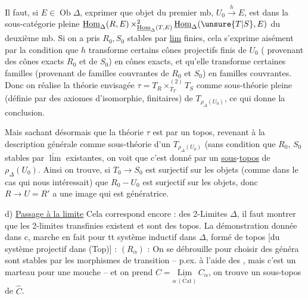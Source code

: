 Il faut, si $E\in\operatorname{Ob}\Delta$, exprimer que  objet du  premier mb, $U_0\xrightarrow{h}E$, est dans  la sous-catégorie pleine $\underline{\mathrm{Hom}}_\Delta(R,E)\mathop{\times}^{2}_{\underline{\mathrm{Hom}}_\Delta(T,E)}\underline{\mathrm{Hom}}_\Delta(\unsure{T|S},E)$ du deuxième mb. Si on a pris $R_0,S_0$ stables par \uline{lim} finies, cela s'exprime aisément par la  condition que $h$ transforme certains cônes projectifs finis de $U_0$ ( provenant des cônes exacts  $R_0$ et de $S_0$) en cônes exacts,
et  qu'elle transforme certaines familles (provenant de familles couvrantes de $R_0$ et $S_0$) en familles couvrantes. Donc on réalise la théorie envisagée $\tau=T_R\mathop{\times}^{(2)}_{T_T}T_S$ comme sous-théorie pleine (définie par des axiomes d'isomorphie, finitaires) de $T_{\rho_\Delta(U_0)}$, ce qui donne la conclusion.

Mais sachant désormais que  la théorie $\tau$ est  par un topos,  revenant à la description générale comme sous-théorie d'un $T_{\rho_\Delta(U_0)}$ (sans  condition que $R_0$, $S_0$ stables par $\underleftarrow{\lim}$ existantes, on voit que c'est donné par un \uline{sous}-\uline{topos} de $\rho_\Delta(U_0)$. Ainsi on trouve, si $T_0\to S_0$ est surjectif sur les objets (comme dans le cas qui nous intéressait) que $R_0-U_0$ est surjectif sur les objets, donc $R\to U=R'$  a une image qui est génératrice.

d) \uline{Passage à la limite} Cela correspond encore : des 2-Limites   $\Delta$, il faut montrer que les 2-limites transfinies existent et sont des topos. La démonstration donnée dans c, marche en fait pour tt système inductif  dans $\Delta$, formé de topos [du système projectif dans (Top)] : $(R_\alpha)$ : On se débrouille pour choisir des
  généra   sont stables par les morphismes de transition  -- p.ex. à l'aide des  , mais c'est un marteau pour une mouche -- et on prend  $C=\underset{\alpha\,(\mathrm{Cat})}{\underline{\mathrm{Lim}}}\, C_\alpha$, on  trouve un sous-topos de $\widehat C$.

